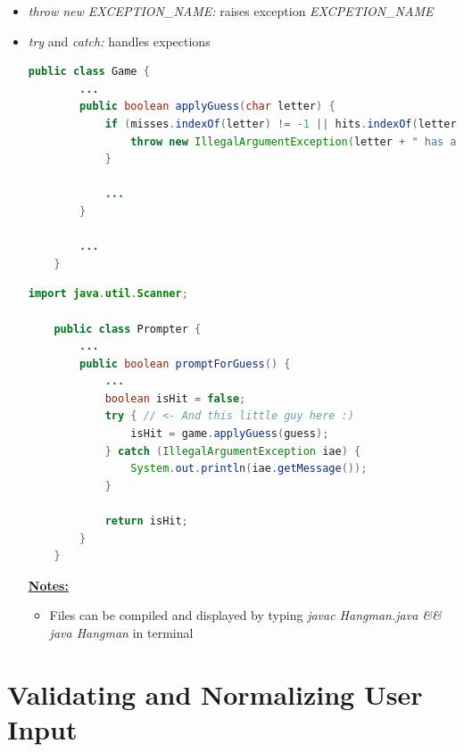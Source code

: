 \documentclass[12pt]{article}
\begin{document}
\begin{itemize}
    \item \textit{throw new EXCEPTION\_NAME:} raises exception \textit{EXCPETION\_NAME}
    \item \textit{try} and \textit{catch:} handles expections

    \begin{lstlisting}[language=Java,caption={lesson\_01/Game.java}]
    public class Game {
        ...
        public boolean applyGuess(char letter) {
            if (misses.indexOf(letter) != -1 || hits.indexOf(letter) != -1) {
                throw new IllegalArgumentException(letter + " has already been guessed"); // <- this little guy here :)
            }

            ...
        }

        ...
    }
    \end{lstlisting}

    \begin{lstlisting}[language=Java,caption={lesson\_01/Prompter.java}]
    import java.util.Scanner;

    public class Prompter {
        ...
        public boolean promptForGuess() {
            ...
            boolean isHit = false;
            try { // <- And this little guy here :)
                isHit = game.applyGuess(guess);
            } catch (IllegalArgumentException iae) {
                System.out.println(iae.getMessage());
            }

            return isHit;
        }
    }
    \end{lstlisting}

    \bigskip

    \underline{\textbf{Notes:}}

    \bigskip

    \begin{itemize}
        \item Files can be compiled and displayed by typing \textit{javac Hangman.java \&\& java Hangman}
        in terminal
    \end{itemize}
\end{itemize}

\bigskip

\section{Validating and Normalizing User Input}

\bigskip
\end{document}
